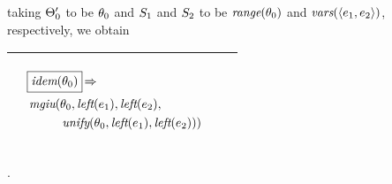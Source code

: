 \documentclass[runningheads]{llncs}
\DeclareMathOperator{\uimplies}{\Rightarrow}
\DeclareMathOperator{\unify}{\emph{unify}}
\DeclareMathOperator{\lef}{\emph{left}}
\DeclareMathOperator{\idem}{\emph{idem}}
\DeclareMathOperator{\mgiu}{\emph{mgiu}}
\begin{document}
\noindent taking $\Theta_{0}'$ to be $\theta_{0}$ and ${S}_{1}$ and ${S}_{2}$  to be $\emph{range}(\theta_{0})$ and $\emph{vars}(\langle e_{1}, e_{2} \rangle)$, respectively,  we obtain
  \begin{center}
  \begin{tabular}{|m{}|m{}||m{}|}
\hline
\begin{center}
{$\begin{aligned}
 & &\begin{aligned}&\boxed{\idem(\thet{0})} \uimplies \\
 &\begin{aligned}
    {\,\mgiu}(&\thet{0}, \lef(\e{1}), \lef(\e{2}), \\
    &\unify(\thet{0}, \lef(\e{1}), \lef(\e{2}))) 
\end{aligned}
\end{aligned} \end{aligned}  $}  \hspace{1cm} 
\end{center}& &  \\  \hline
\end{tabular}.
\end{center}
\end{document}
